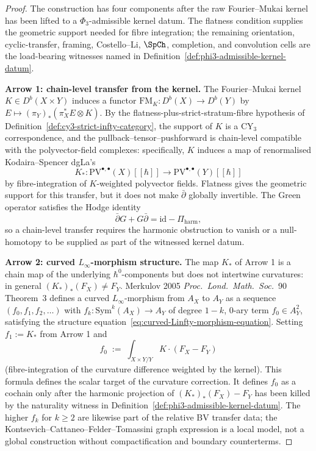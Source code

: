 \begin{proof}
The construction has four components after the raw Fourier--Mukai
kernel has been lifted to a $\Phi_3$-admissible kernel datum. The
flatness condition supplies the geometric support needed for fibre
integration; the remaining orientation, cyclic-transfer, framing,
Costello--Li, $\SpCh$, completion, and convolution cells are the
load-bearing witnesses named in
Definition~\ref{def:phi3-admissible-kernel-datum}.

\textbf{Arrow 1: chain-level transfer from the kernel.} The Fourier--Mukai kernel $K \in D^b(X \times Y)$ induces a functor $\mathrm{FM}_K \colon D^b(X) \to D^b(Y)$ by $E \mapsto (\pi_Y)_*(\pi_X^* E \otimes K)$. By the flatness-plus-strict-stratum-fibre hypothesis of Definition~\ref{def:cy3-strict-infty-category}, the support of $K$ is a CY$_3$ correspondence, and the pullback--tensor--pushforward is chain-level compatible with the polyvector-field complexes: specifically, $K$ induces a map of renormalised Kodaira--Spencer dgLa's
\[
 K_* \colon \mathrm{PV}^{\bullet,\bullet}(X)[\![\hbar]\!] \longrightarrow \mathrm{PV}^{\bullet,\bullet}(Y)[\![\hbar]\!]
\]
by fibre-integration of $K$-weighted polyvector fields. Flatness gives
the geometric support for this transfer, but it does not make
\(\bar\partial\) globally invertible. The Green operator satisfies the
Hodge identity
\[
 \bar\partial G+G\bar\partial=\mathrm{id}-\Pi_{\mathrm{harm}},
\]
so a chain-level transfer requires the harmonic obstruction to vanish
or a null-homotopy to be supplied as part of the witnessed kernel datum.

\textbf{Arrow 2: curved $L_\infty$-morphism structure.} The map $K_*$ of Arrow 1 is a chain map of the underlying $\hbar^0$-components but does not intertwine curvatures: in general $(K_*)_*(F_X) \neq F_Y$. Merkulov 2005 \textit{Proc.~Lond.~Math.~Soc.}~90 Theorem~3 defines a curved $L_\infty$-morphism from $A_X$ to $A_Y$ as a sequence $(f_0, f_1, f_2, \ldots)$ with $f_k \colon \mathrm{Sym}^k(A_X) \to A_Y$ of degree $1-k$, $0$-ary term $f_0 \in A_Y^2$, satisfying the structure equation~\eqref{eq:curved-Linfty-morphism-equation}. Setting $f_1 := K_*$ from Arrow 1 and
\[
 f_0 \;:=\; \int_{X \times Y / Y} K \cdot (F_X - F_Y)
\]
(fibre-integration of the curvature difference weighted by the kernel).
This formula defines the scalar target of the curvature correction. It
defines \(f_0\) as a cochain only after the harmonic projection of
\((K_*)_*(F_X)-F_Y\) has been killed by the naturality witness in
Definition~\ref{def:phi3-admissible-kernel-datum}. The higher \(f_k\)
for \(k\geq2\) are likewise part of the relative BV transfer data; the
Kontsevich--Cattaneo--Felder--Tomassini graph expression is a local
model, not a global construction without compactification and boundary
counterterms.


\end{proof}
